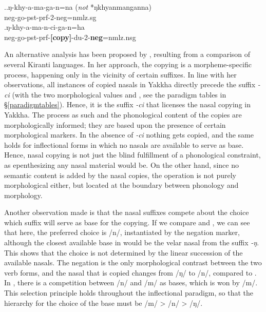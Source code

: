 \ex.\ag.ŋ-khy-a-ma-ga-n=na (\emph{not} *ŋkhyanmanganna)\\
{\sc neg-}go{\sc -pst-prf-2-neg=nmlz.sg}\\
\bg.ŋ-khy-a-ma-n-ci-ga-n=ha\\
{\sc neg-}go{\sc -pst-prf-{\bf [copy]}-du-2-{\bf neg}=nmlz.nsg}\\


An alternative analysis has been proposed by \citet{Zimmermann2012_Affix}, resulting from a comparison of several Kiranti languages. In her approach, the copying is a morpheme-specific process, happening only in the vicinity of certain suffixes. In line with her observations, all instances of copied nasals in Yakkha directly precede the suffix  \emph{-ci} (with the two morphological values  and , see the paradigm tables in §\ref{paradigmtables}). Hence, it is the suffix \emph{-ci} that licenses the nasal copying in Yakkha. The process as such and the phonological content of the copies are morphologically informed; they are based upon the presence of certain morphological markers. In the absence of \emph{-ci} nothing gets copied, and the same holds for inflectional forms in which no nasals are available to serve as base. Hence, nasal copying is not just the blind fulfillment of a phonological constraint, as epenthesizing any nasal material would be. On the other hand, since no semantic content is added by the nasal copies, the operation is not purely morphological either, but located at the boundary between phonology and morphology.


Another observation made is that the nasal suffixes compete about the choice which suffix will serve as base for the copying. If we compare \Next[a] and \Next[b], we can see that here, the preferred choice is /n/, instantiated by  the negation marker, although the closest available base in \Next[b] would be the velar nasal from the suffix \emph{-ŋ}. This shows that the choice is not determined by the linear succession of the available nasals. The negation is the only morphological contrast between the two verb forms, and the nasal that is copied changes from /ŋ/ to /n/, compared to \Next[a].  In \Next[c], there is a competition between /n/ and /m/ as bases, which is won by /m/. This selection principle holds throughout the inflectional paradigm, so that the hierarchy for the choice of the base must be /m/ > /n/ > /ŋ/.


